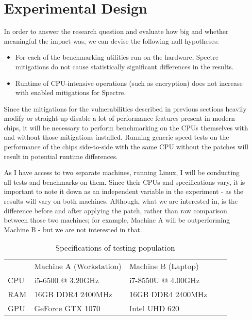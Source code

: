 \documentclass{csfourzero}
\begin{document}
\section{Experimental Design}
\label{sec:exp}
In order to answer the research question and evaluate how big and whether meaningful the impact was, we can devise the following null hypotheses: 
\begin{itemize}
  \item For each of the benchmarking utilities run on the hardware, Spectre mitigations do not cause statistically significant differences in the results.
  \item Runtime of CPU-intensive operations (such as encryption) does not increase with enabled mitigations for Spectre.
\end{itemize}

Since the mitigations for the vulnerabilities described in previous sections heavily modify or straight-up disable a lot of performance features present in modern chips, it will be necessary to perform benchmarking on the CPUs themselves with and without those mitigations installed. Running generic speed tests on the performance of the chips side-to-side with the same CPU without the patches will result in potential runtime differences.

As I have access to two separate machines, running Linux, I will be conducting all tests and benchmarks on them. Since their CPUs and specifications vary, it is important to note it down as an independent variable in the experiment - as the results will vary on both machines. Although, what we are interested in, is the difference before and after applying the patch, rather than raw comparison between those two machines; for example, Machine A will be outperforming Machine B - but we are not interested in that.


\begin{table}[h]
\centering
\begin{tabular}{|l|l|l|ll}
\cline{1-3}
    & Machine A (Workstation)         & Machine B (Laptop) &  &  \\ \cline{1-3}
CPU & i5-6500 @ 3.20GHz & i7-8550U @ 4.00GHz       &  &  \\ \cline{1-3}
RAM & 16GB DDR4 2400MHz & 16GB DDR4 2400MHz          &  &  \\ \cline{1-3}
GPU & GeForce GTX 1070  & Intel UHD 620          &  &  \\ \cline{1-3}
\end{tabular}%
\caption{Specifications of testing population}
\label{tab:machines}
\end{table}
\end{document}
